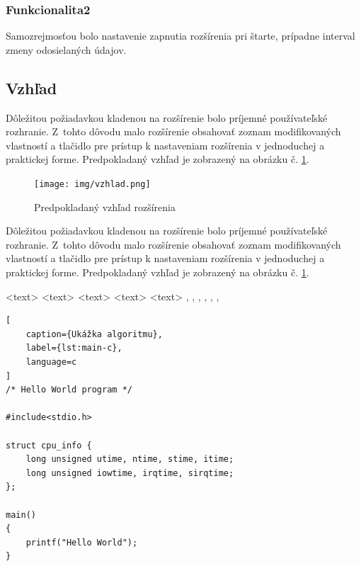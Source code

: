 \subsubsection{Funkcionalita2}
\noindent Samozrejmosťou bolo nastavenie zapnutia rozšírenia pri štarte, prípadne interval zmeny odosielaných údajov.

\subsection{Vzhľad}
\noindent Dôležitou požiadavkou kladenou na rozšírenie bolo príjemné používateľské rozhranie. Z~tohto dôvodu malo rozšírenie obsahovať zoznam modifikovaných vlastností a tlačidlo pre prístup k nastaveniam rozšírenia v jednoduchej a praktickej forme. Predpokladaný vzhľad je zobrazený na obrázku č. \ref{vzhladobr}.
\begin{figure}[!htbp]
	\centering
	\texttt{[image: img/vzhlad.png]}
	\caption{Predpokladaný vzhľad rozšírenia}
	\label{vzhladobr}
\end{figure}
\noindent Dôležitou požiadavkou kladenou na rozšírenie bolo príjemné používateľské rozhranie.\cite{t00} Z~tohto dôvodu malo rozšírenie obsahovať zoznam modifikovaných vlastností a tlačidlo pre prístup k nastaveniam rozšírenia v jednoduchej a praktickej forme. Predpokladaný vzhľad je zobrazený na obrázku č. \ref{vzhladobr}.

\begin{algorithm}
\scriptsize
\begin{algorithmic}
	\STATE <text>
	  \ELSE {} \ENDIF
	    \ENDIF
	  \ENDFOR
	  \ENDFOR
	  \ENDFOR
	  \ENDWHILE
	\REPEAT {} 
	\LOOP {} \ENDLOOP
	\REQUIRE <text>
	\ENSURE <text>
	\RETURN <text>
	\PRINT <text>
	\AND, \OR, \XOR, \NOT, \TO, \TRUE, \FALSE
\end{algorithmic}
\caption{Ukážka príkazov pre algorithmic}
\label{alg:preview}
\end{algorithm}

\begin{lstlisting}[
	caption={Ukážka algoritmu},
	label={lst:main-c},
	language=c
]
/* Hello World program */

#include<stdio.h>

struct cpu_info {
	long unsigned utime, ntime, stime, itime;
	long unsigned iowtime, irqtime, sirqtime;
};

main()
{
	printf("Hello World");
}
\end{lstlisting}

